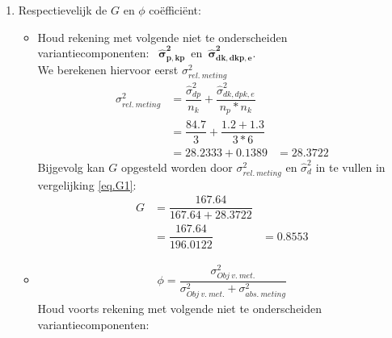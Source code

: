 {\begin{enumerate}
\begin{itemize}
	\begin{tabular}{|c|c|c|c|c|c|c|c|} \hline
	 & $ \hat{\sigma}^2_{d} $ & $ \hat{\sigma}^2_{k} $& $ \hat{\sigma}^2_{p, dp} $ & $ \hat{\sigma}^2_{dk} $ & $ \hat{\sigma}^2_{dp} $ & $ \hat{\sigma}^2_{kp} $ &
	 $\sigma^2_{kp, dpk, e}$ \\ \hline
	$\sigma^2$  			& $167.64$ 			    & $ 3.211 $  	& $615.8+84.7$   & $1.3$ & $ . $	& $ . $& $ 1.2 + 1.3$ \\
	$n_.$ 				& . 					& $3$			& 2	  & $ 3$		  	 & $ . $ 	& $ . $&  $2 *3$ \\ \hline
	$\sigma / n_.$      & .						& $1.0703 $		& $350.25$   & $0.4333$		 & $.$		& $ . $&  $0.4167$ \\ \hline
	\end{tabular} \\
	De grafische weergave van dit opzet is het volgende:\\

	
\end{itemize}

\item Respectievelijk de $G$ en $\phi$ co\"effici\"ent:
\begin{itemize}
	\item	Houd rekening met volgende niet te onderscheiden variantiecomponenten:~ 
	$ \bm{\hat{\sigma}^2_{p,kp}} $~en~$\bm{\hat{\sigma}^2_{dk, dkp, e} }$.\\
	We berekenen hiervoor eerst $\sigma^2_{rel.~meting}$
	\begin{align*}
		\sigma^2_{rel.~meting} 	&=  \dfrac{\hat{\sigma}^2_{dp}}{n_k} + \dfrac{\hat{\sigma}^2_{dk,dpk,e}}{n_p*n_k} \\
								&=  \dfrac{{84.7}}{3} + \dfrac{{1.2 + 1.3}}{3*6}\\
								&= 28.2333 + 0.1389 &= 28.3722
	\end{align*}
	Bijgevolg kan $G$ opgesteld worden door $\sigma^2_{rel.~meting}$ en $\hat{\sigma}^2_{d}$ in te vullen in vergelijking \ref{eq.G1}:
	\begin{align*}
		G 	&=\dfrac{167.64}{167.64+  28.3722}\\
			&=\dfrac{167.64}{ 196.0122}&=0.8553
	\end{align*}

	\item
	\begin{align}
		\phi =\dfrac{\sigma^2_{Obj~v.~met.}}{\sigma^2_{Obj~v.~met.}+ \sigma^2_{abs.~meting}} \label{eq.phi}
	\end{align}
	Houd voorts rekening met volgende niet te onderscheiden variantiecomponenten:~ \\


\end{itemize}
\end{enumerate}}
